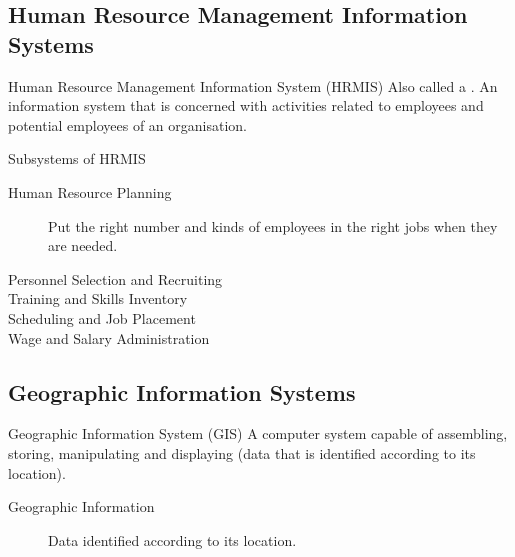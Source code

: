 \documentclass[\main/notes.tex]{subfiles}
\begin{document}
			\subsection{Human Resource Management Information Systems}
				\begin{definition}{Human Resource Management Information System (HRMIS)}
					Also called a . An information system that is concerned with activities related to employees and potential employees of an organisation.
				\end{definition}
				\begin{sidenote}{Subsystems of HRMIS}
					\begin{description}
						\item[Human Resource Planning] Put the right number and kinds of employees in the right jobs when they are needed.
						\item[Personnel Selection and Recruiting]
						\item[Training and Skills Inventory]
						\item[Scheduling and Job Placement]
						\item[Wage and Salary Administration]  
					\end{description}
				\end{sidenote}
			\subsection{Geographic Information Systems}
				\begin{definition}{Geographic Information System (GIS)}
					A computer system capable of assembling, storing, manipulating and displaying  (data that is identified according to its location).
					\begin{description}
						\item[Geographic Information] Data identified according to its location.
					\end{description}
				\end{definition}
\end{document}
